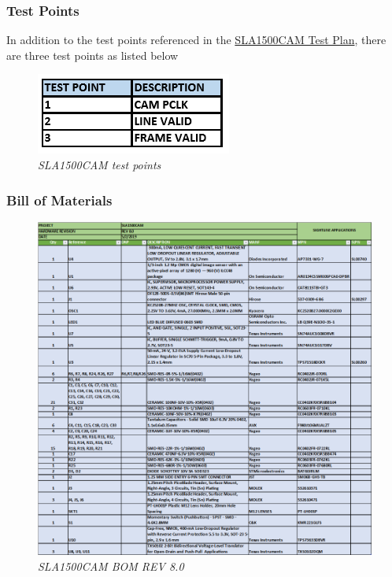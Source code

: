 \documentclass[11pt]{article}
\begin{document}
\subsubsection{Test Points}
In addition to the test points referenced in the 
\href{https://github.com/phamtaiece/Capstone-Sightline/blob/master/Test\%20Plan/SLA1500_CAM_TestV1.pdf}{SLA1500CAM Test Plan}, there are three test points as listed below

    \begin{figure}[H]
	\centering	
	\includegraphics[width=3 in]{testpoint}
	\caption{\textit{SLA1500CAM test points}}	
	\end{figure}

\subsubsection{Bill of Materials}

    \begin{figure}[H]
	\centering	
	\includegraphics[width=7 in]{SLA1500CAM_BOM_V8}
	\caption{\textit{SLA1500CAM BOM REV 8.0}}	
	\end{figure}
\end{document}
